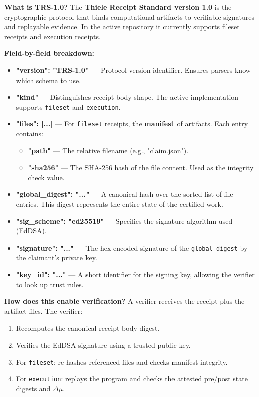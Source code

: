 \textbf{What is TRS-1.0?} The \textbf{Thiele Receipt Standard version 1.0} is the cryptographic protocol that binds computational artifacts to verifiable signatures and replayable evidence. In the active repository it currently supports fileset receipts and execution receipts.

\textbf{Field-by-field breakdown:}
\begin{itemize}
    \item \textbf{"version": "TRS-1.0"} — Protocol version identifier. Ensures parsers know which schema to use.
    
    \item \textbf{"kind"} — Distinguishes receipt body shape. The active implementation supports \texttt{fileset} and \texttt{execution}.
    \item \textbf{"files": [...]} — For \texttt{fileset} receipts, the \textbf{manifest} of artifacts. Each entry contains:
    \begin{itemize}
        \item \textbf{"path"} — The relative filename (e.g., "claim.json").
        \item \textbf{"sha256"} — The SHA-256 hash of the file content. Used as the integrity check value.
    \end{itemize}
    
    \item \textbf{"global\_digest": "..."} — A canonical hash over the sorted list of file entries. This digest represents the entire state of the certified work.
    
    \item \textbf{"sig\_scheme": "ed25519"} — Specifies the signature algorithm used (EdDSA).
    
    \item \textbf{"signature": "..."} — The hex-encoded signature of the \texttt{global\_digest} by the claimant's private key.
    
    \item \textbf{"key\_id": "..."} — A short identifier for the signing key, allowing the verifier to look up trust rules.
\end{itemize}

\textbf{How does this enable verification?} A verifier receives the receipt plus the artifact files. The verifier:
\begin{enumerate}
    \item Recomputes the canonical receipt-body digest.
    \item Verifies the EdDSA signature using a trusted public key.
    \item For \texttt{fileset}: re-hashes referenced files and checks manifest integrity.
    \item For \texttt{execution}: replays the program and checks the attested pre/post state digests and $\Delta\mu$.
\end{enumerate}

